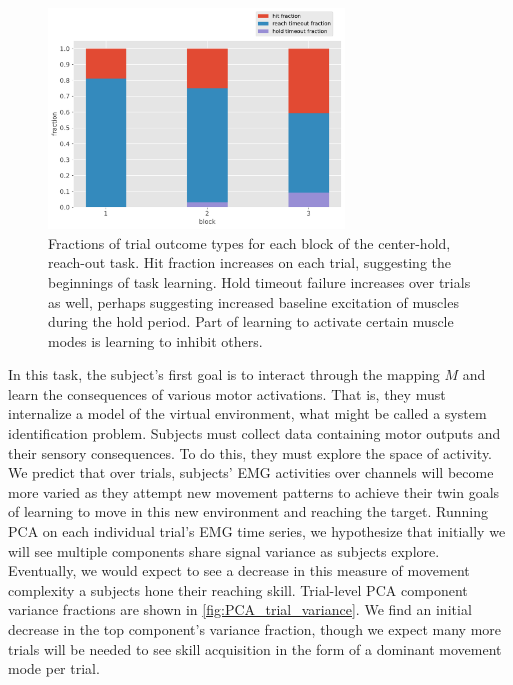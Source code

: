 \documentclass[
  a4paper,
]{article}
\begin{document}
\begin{figure}
\hypertarget{fig:hit_fraction}{%
\centering
\includegraphics[width=0.7\textwidth,height=\textheight]{images/data_analysis/center_hold/hit_fraction.pdf}
\caption{Fractions of trial outcome types for each block of the
center-hold, reach-out task. Hit fraction increases on each trial,
suggesting the beginnings of task learning. Hold timeout failure
increases over trials as well, perhaps suggesting increased baseline
excitation of muscles during the hold period. Part of learning to
activate certain muscle modes is learning to inhibit
others.}\label{fig:hit_fraction}
}
\end{figure}

In this task, the subject's first goal is to interact through the
mapping \(M\) and learn the consequences of various motor activations.
That is, they must internalize a model of the virtual environment, what
might be called a system identification problem. Subjects must collect
data containing motor outputs and their sensory consequences. To do
this, they must explore the space of activity. We predict that over
trials, subjects' EMG activities over channels will become more varied
as they attempt new movement patterns to achieve their twin goals of
learning to move in this new environment and reaching the target.
Running PCA on each individual trial's EMG time series, we hypothesize
that initially we will see multiple components share signal variance as
subjects explore. Eventually, we would expect to see a decrease in this
measure of movement complexity a subjects hone their reaching skill.
Trial-level PCA component variance fractions are shown in
\cref{fig:PCA_trial_variance}. We find an initial decrease in the top
component's variance fraction, though we expect many more trials will be
needed to see skill acquisition in the form of a dominant movement mode
per trial.
\end{document}
